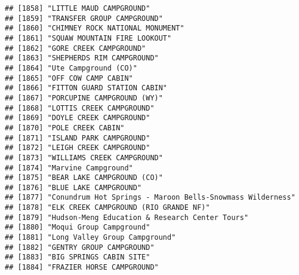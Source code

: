 \documentclass[
]{article}
\begin{document}
\begin{verbatim}
## [1858] "LITTLE MAUD CAMPGROUND"                                                              
## [1859] "TRANSFER GROUP CAMPGROUND"                                                           
## [1860] "CHIMNEY ROCK NATIONAL MONUMENT"                                                      
## [1861] "SQUAW MOUNTAIN FIRE LOOKOUT"                                                         
## [1862] "GORE CREEK CAMPGROUND"                                                               
## [1863] "SHEPHERDS RIM CAMPGROUND"                                                            
## [1864] "Ute Campground (CO)"                                                                 
## [1865] "OFF COW CAMP CABIN"                                                                  
## [1866] "FITTON GUARD STATION CABIN"                                                          
## [1867] "PORCUPINE CAMPGROUND (WY)"                                                           
## [1868] "LOTTIS CREEK CAMPGROUND"                                                             
## [1869] "DOYLE CREEK CAMPGROUND"                                                              
## [1870] "POLE CREEK CABIN"                                                                    
## [1871] "ISLAND PARK CAMPGROUND"                                                              
## [1872] "LEIGH CREEK CAMPGROUND"                                                              
## [1873] "WILLIAMS CREEK CAMPGROUND"                                                           
## [1874] "Marvine Campground"                                                                  
## [1875] "BEAR LAKE CAMPGROUND (CO)"                                                           
## [1876] "BLUE LAKE CAMPGROUND"                                                                
## [1877] "Conundrum Hot Springs - Maroon Bells-Snowmass Wilderness"                            
## [1878] "ELK CREEK CAMPGROUND (RIO GRANDE NF)"                                                
## [1879] "Hudson-Meng Education & Research Center Tours"                                       
## [1880] "Moqui Group Campground"                                                              
## [1881] "Long Valley Group Campground"                                                        
## [1882] "GENTRY GROUP CAMPGROUND"                                                             
## [1883] "BIG SPRINGS CABIN SITE"                                                              
## [1884] "FRAZIER HORSE CAMPGROUND"                                                            

\end{verbatim}
\end{document}
